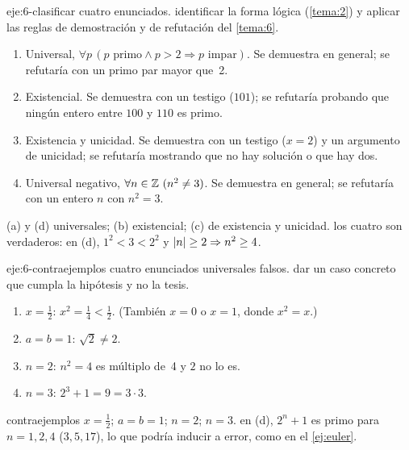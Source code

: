 \begin{solucion}{eje:6-clasificar}
\datos cuatro enunciados.
\planteamiento identificar la forma lógica (\cref{tema:2}) y aplicar las reglas de demostración y de refutación del \cref{tema:6}.
\pasos
\begin{enumerate}[label=(\alph*)]
  \item Universal, $\forall p\,(p\text{ primo}\wedge p>2\Rightarrow p\text{ impar})$. Se demuestra en general; se refutaría con un primo par mayor que~2.
  \item Existencial. Se demuestra con un testigo ($101$); se refutaría probando que ningún entero entre $100$ y $110$ es primo.
  \item Existencia y unicidad. Se demuestra con un testigo ($x=2$) y un argumento de unicidad; se refutaría mostrando que no hay solución o que hay dos.
  \item Universal negativo, $\forall n\in\Z\ (n^{2}\neq 3)$. Se demuestra en general; se refutaría con un entero $n$ con $n^{2}=3$.
\end{enumerate}
\resultado (a) y (d) universales; (b) existencial; (c) de existencia y unicidad.
\comprobacion los cuatro son verdaderos: en (d), $1^{2}<3<2^{2}$ y $\lvert n\rvert\ge 2\Rightarrow n^{2}\ge 4$.
\end{solucion}

\begin{solucion}{eje:6-contraejemplos}
\datos cuatro enunciados universales falsos.
\planteamiento dar un caso concreto que cumpla la hipótesis y no la tesis.
\pasos
\begin{enumerate}[label=(\alph*)]
  \item $x=\tfrac12$: $x^{2}=\tfrac14<\tfrac12$. (También $x=0$ o $x=1$, donde $x^{2}=x$.)
  \item $a=b=1$: $\sqrt2\neq 2$.
  \item $n=2$: $n^{2}=4$ es múltiplo de~4 y $2$ no lo es.
  \item $n=3$: $2^{3}+1=9=3\cdot 3$.
\end{enumerate}
\resultado contraejemplos $x=\tfrac12$; $a=b=1$; $n=2$; $n=3$.
\comprobacion en (d), $2^{n}+1$ es primo para $n=1,2,4$ ($3,5,17$), lo que podría inducir a error, como en el \cref{ej:euler}.
\end{solucion}

